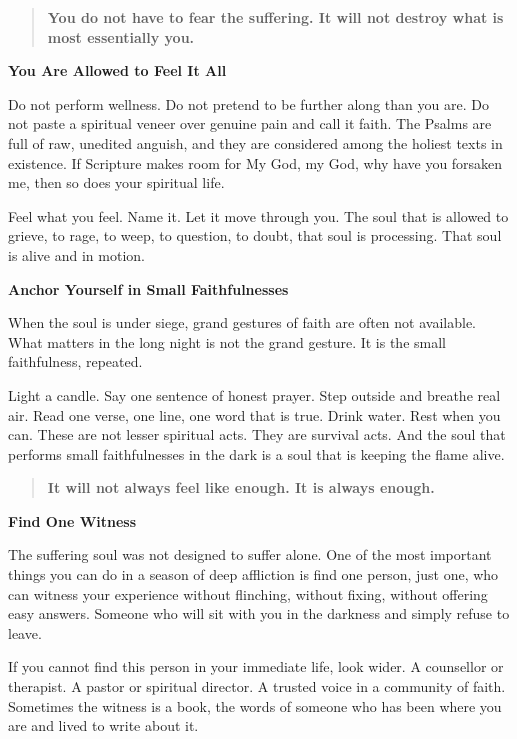 \begin{quote}
\textbf{You do not have to fear the suffering. It will not destroy what
is most essentially you.}
\end{quote}

\textbf{You Are Allowed to Feel It All}

Do not perform wellness. Do not pretend to be further along than you
are. Do not paste a spiritual veneer over genuine pain and call it
faith. The Psalms are full of raw, unedited anguish, and they are
considered among the holiest texts in existence. If Scripture makes room
for My God, my God, why have you forsaken me, then so does your
spiritual life.

Feel what you feel. Name it. Let it move through you. The soul that is
allowed to grieve, to rage, to weep, to question, to doubt, that soul is
processing. That soul is alive and in motion.

\textbf{Anchor Yourself in Small Faithfulnesses}

When the soul is under siege, grand gestures of faith are often not
available. What matters in the long night is not the grand gesture. It
is the small faithfulness, repeated.

Light a candle. Say one sentence of honest prayer. Step outside and
breathe real air. Read one verse, one line, one word that is true. Drink
water. Rest when you can. These are not lesser spiritual acts. They are
survival acts. And the soul that performs small faithfulnesses in the
dark is a soul that is keeping the flame alive.

\begin{quote}
\textbf{It will not always feel like enough. It is always enough.}
\end{quote}

\textbf{Find One Witness}

The suffering soul was not designed to suffer alone. One of the most
important things you can do in a season of deep affliction is find one
person, just one, who can witness your experience without flinching,
without fixing, without offering easy answers. Someone who will sit with
you in the darkness and simply refuse to leave.

If you cannot find this person in your immediate life, look wider. A
counsellor or therapist. A pastor or spiritual director. A trusted voice
in a community of faith. Sometimes the witness is a book, the words of
someone who has been where you are and lived to write about it.

